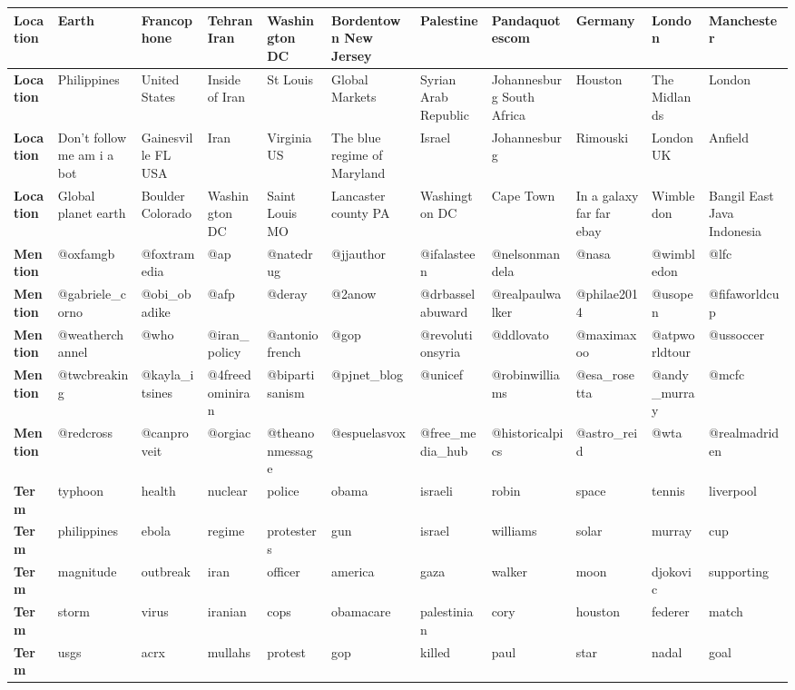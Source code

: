 \begin{table}[t!]
{{\begin{tabular}{|l|l|l|l|l|l|l|l|l|l|l|}
\textbf{Location} & Earth & Francophone & Tehran Iran & Washington DC & Bordentown New Jersey & Palestine & Pandaquotescom & Germany & London & Manchester\tabularnewline
\hline 
\textbf{Location} & Philippines & United States & Inside of Iran & St Louis & Global Markets & Syrian Arab Republic & Johannesburg South Africa & Houston & The Midlands & London\tabularnewline
\hline 
\textbf{Location} & Don't follow me am i a bot & Gainesville FL USA & Iran & Virginia US & The blue regime of Maryland & Israel & Johannesburg & Rimouski & London UK & Anfield\tabularnewline
\hline 
\textbf{Location} & Global planet earth & Boulder Colorado & Washington DC & Saint Louis MO & Lancaster county PA & Washington DC & Cape Town & In a galaxy far far ebay & Wimbledon & Bangil East Java Indonesia\tabularnewline
\hline 
\hline 
\textbf{Mention} & @oxfamgb & @foxtramedia & @ap & @natedrug & @jjauthor & @ifalasteen & @nelsonmandela & @nasa & @wimbledon & @lfc\tabularnewline
\hline 
\textbf{Mention} & @gabriele\_corno & @obi\_obadike & @afp & @deray & @2anow & @drbasselabuward & @realpaulwalker & @philae2014 & @usopen & @fifaworldcup\tabularnewline
\hline 
\textbf{Mention} & @weatherchannel & @who & @iran\_policy & @antoniofrench & @gop & @revolutionsyria & @ddlovato & @maximaxoo & @atpworldtour & @ussoccer\tabularnewline
\hline 
\textbf{Mention} & @twcbreaking & @kayla\_itsines & @4freedominiran & @bipartisanism & @pjnet\_blog & @unicef & @robinwilliams & @esa\_rosetta & @andy\_murray & @mcfc\tabularnewline
\hline 
\textbf{Mention} & @redcross & @canproveit & @orgiac & @theanonmessage & @espuelasvox & @free\_media\_hub & @historicalpics & @astro\_reid & @wta & @realmadriden\tabularnewline
\hline 
\hline 
\textbf{Term} & typhoon & health & nuclear & police & obama & israeli & robin & space & tennis & liverpool\tabularnewline
\hline 
\textbf{Term} & philippines & ebola & regime & protesters & gun & israel & williams & solar & murray & cup\tabularnewline
\hline 
\textbf{Term} & magnitude & outbreak & iran & officer & america & gaza & walker & moon & djokovic & supporting\tabularnewline
\hline 
\textbf{Term} & storm & virus & iranian  & cops & obamacare & palestinian & cory & houston & federer & match\tabularnewline
\hline 
\textbf{Term} & usgs & acrx & mullahs & protest & gop & killed & paul & star & nadal & goal\tabularnewline
\hline 
\end{tabular}

}}
\label{table:top10MItopicsLocations}
\end{table}


